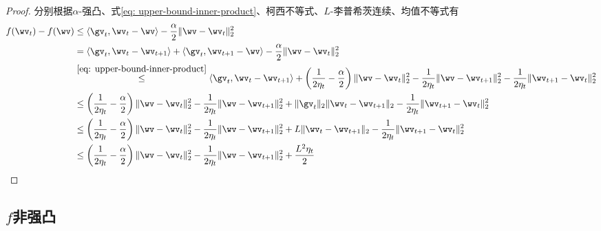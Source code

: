 \documentclass{ctexart}
\begin{document}
\begin{proof}
    分别根据$\alpha$-强凸、式\eqref{eq: upper-bound-inner-product}、柯西不等式、$L$-李普希茨连续、均值不等式有
    \begin{align*}
        f(\wv_t) - f(\wv)
         & \le \langle \gv_t, \wv_t - \wv \rangle - \frac{\alpha}{2} \| \wv - \wv_t \|_2^2                                                                                                                                                                                         \\
         & = \langle \gv_t, \wv_t - \wv_{t+1} \rangle + \langle \gv_t, \wv_{t+1} - \wv \rangle - \frac{\alpha}{2} \| \wv - \wv_t \|_2^2                                                                                                                                            \\
         & \overset{\eqref{eq: upper-bound-inner-product}}{\le} \langle \gv_t, \wv_t - \wv_{t+1} \rangle + \left( \frac{1}{2\eta_t} - \frac{\alpha}{2} \right) \| \wv - \wv_t \|_2^2 - \frac{1}{2\eta_t} \| \wv - \wv_{t+1} \|_2^2 - \frac{1}{2\eta_t} \| \wv_{t+1} - \wv_t \|_2^2 \\
         & \le \left( \frac{1}{2\eta_t} - \frac{\alpha}{2} \right) \| \wv - \wv_t \|_2^2 - \frac{1}{2\eta_t} \| \wv - \wv_{t+1} \|_2^2 + \|\gv_t\|_2 \|\wv_t - \wv_{t+1}\|_2 - \frac{1}{2\eta_t} \| \wv_{t+1} - \wv_t \|_2^2                                                       \\
         & \le \left( \frac{1}{2\eta_t} - \frac{\alpha}{2} \right) \| \wv - \wv_t \|_2^2 - \frac{1}{2\eta_t} \| \wv - \wv_{t+1} \|_2^2 + L \|\wv_t - \wv_{t+1}\|_2 - \frac{1}{2\eta_t} \| \wv_{t+1} - \wv_t \|_2^2                                                                 \\
         & \le \left( \frac{1}{2\eta_t} - \frac{\alpha}{2} \right) \| \wv - \wv_t \|_2^2 - \frac{1}{2\eta_t} \| \wv - \wv_{t+1} \|_2^2 + \frac{L^2 \eta_t}{2}
    \end{align*}
\end{proof}

\subsection{$f$非强凸}
\end{document}
